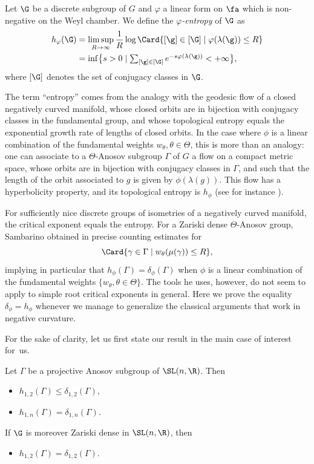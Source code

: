 \begin{defi} \label{def - entropy}
Let $\G$ be a discrete subgroup of $G$ and $\varphi$ a linear form on $\fa$ which is non-negative on the Weyl chamber. We define the \emph{$\varphi$-entropy} of $\G$ as
\begin{align*}
h_\varphi(\G) &= \limsup_{R\to \infty} \frac{1}{R} \log \Card \{ [\g] \in [\G] \mid \varphi(\lambda(\g)) \leq R\} \\
&\textstyle= \inf\bigl\{s>0\mid \sum_{[\g]\in [\G]} e^{-s\varphi(\lambda(\g))} < +\infty\bigr\},
\end{align*}
where $[\G]$ denotes the set of conjugacy classes in $\G$.
\end{defi}

The term ``entropy'' comes from the analogy with the geodesic flow of a closed negatively curved manifold, whose closed orbits are in bijection with conjugacy classes in the fundamental group, and whose topological entropy equals the exponential growth rate of lengths of closed orbits. In the case where $\phi$ is a linear combination of the fundamental weights $w_\theta, \theta \in \Theta$, this is more than an analogy: one can associate to a $\Theta$-Anosov subgroup $\Gamma$ of $G$ a flow on a compact metric space, whose orbits are in bijection with conjugacy classes in $\Gamma$, and such that the length of the orbit associated to $g$ is given by $\phi(\lambda(g))$. This flow has a hyperbolicity property, and its topological entropy is $h_\phi$ (see for instance \cite{sambarino2014quantitative}).

For sufficiently nice discrete groups of isometries of a negatively curved manifold, the critical exponent equals the entropy. For a Zariski dense $\Theta$-Anosov group, Sambarino obtained in \cite{sambarino2014quantitative} precise counting estimates for
\[\Card \{\gamma \in \Gamma \mid w_\theta(\mu(\gamma))\leq R\},\]
implying in particular that $h_\phi(\Gamma) = \delta_\phi(\Gamma)$ when $\phi$ is a linear combination of the fundamental weights $\{w_\theta,\theta \in \Theta\}$. The tools he uses, however, do not seem to apply to simple root critical exponents in general. Here we prove the equality $\delta_\phi = h_\phi$ whenever we manage to generalize the classical arguments that work in negative curvature.

For the sake of clarity, let us first state our result in the main case of interest for~us.

\begin{theorem}\label{theo-specialcaseSL(n,R)}
Let $\Gamma$ be a projective Anosov subgroup of $\SL(n,\R)$. Then
\begin{itemize}
\item $h_{1,2}(\Gamma)\leq \delta_{1,2}(\Gamma),$
\item $h_{1,n}(\Gamma)= \delta_{1,n}(\Gamma).$
\end{itemize}
If $\G$ is moreover Zariski dense in $\SL(n,\R)$, then
\begin{itemize}
\item $h_{1,2}(\Gamma) = \delta_{1,2}(\Gamma)$.
\end{itemize}
\end{theorem}

